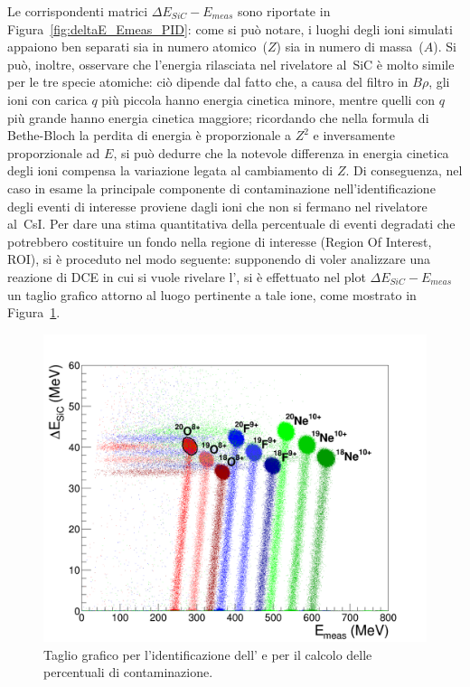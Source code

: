 Le corrispondenti matrici $\Delta E_{SiC} - E_{meas}$ sono riportate in Figura~\ref{fig:deltaE_Emeas_PID}: come si può notare, i luoghi degli ioni simulati appaiono ben separati sia in numero atomico~($Z$) sia in numero di massa~($A$).
Si può, inoltre, osservare che l'energia rilasciata nel rivelatore al~SiC è molto simile per le tre specie atomiche: 
ciò dipende dal fatto che, a causa del filtro in $B \rho$, gli ioni con carica $q$ più piccola hanno energia cinetica minore, mentre quelli con $q$ più grande hanno energia cinetica maggiore; ricordando che nella formula di Bethe-Bloch la perdita di energia è proporzionale a $Z^2$ e inversamente proporzionale ad $E$, si può dedurre che la notevole differenza in energia cinetica degli ioni compensa la variazione legata al cambiamento di $Z$.
Di conseguenza, nel caso in esame la principale componente di contaminazione nell'identificazione degli eventi di interesse proviene dagli ioni che non si fermano nel rivelatore al~CsI.
Per dare una stima quantitativa della percentuale di eventi degradati che potrebbero costituire un fondo nella regione di interesse (Region Of Interest, ROI), si è proceduto nel modo seguente: supponendo di voler analizzare una reazione di DCE in cui si vuole rivelare l', si è effettuato nel plot $\Delta E_{SiC} - E_{meas}$ un taglio grafico attorno al luogo pertinente a tale ione, come mostrato in Figura~\ref{fig:deltaE_Emeas_taglio}.
\begin{figure} [!p]
	\centering
	\includegraphics[width=\textwidth, keepaspectratio]{Grafici_Tesi2/PID/deltaE_Emeas_quadrata_taglio_label.png}
	\caption{Taglio grafico per l'identificazione dell' e per il calcolo delle percentuali di contaminazione.} \label{fig:deltaE_Emeas_taglio}
\end{figure}
